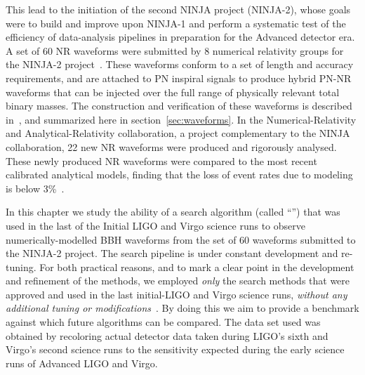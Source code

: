 This lead to the initiation of the second NINJA project (NINJA-2), whose goals 
were to build and improve upon NINJA-1 and perform a systematic test of the 
efficiency of data-analysis pipelines in preparation for the Advanced detector 
era. A set of 60 NR waveforms were submitted by 8 numerical relativity groups 
for the NINJA-2 project~\cite{Ajith:2012az}. These waveforms conform 
to a set of length and accuracy requirements, and
are attached to PN inspiral signals to produce hybrid PN-NR waveforms that can 
be injected over the full range of physically relevant total binary masses.
The construction and verification of these waveforms is described 
in~\cite{Ajith:2012az}, and summarized here in 
section~\ref{sec:waveforms}. In the Numerical-Relativity and 
Analytical-Relativity collaboration, a project complementary to the NINJA 
collaboration, 22 new NR waveforms were produced and rigorously analysed. These 
newly produced NR waveforms were compared to the most recent calibrated 
analytical models, finding that the loss of event rates due to modeling is 
below 3\%~\cite{Hinder:2013oqa}. 

In this chapter we study the ability of a search algorithm (called 
``\ihope{}'') that was 
used in the last of the Initial LIGO and Virgo science runs to observe
numerically-modelled BBH waveforms from the set of 60 waveforms
submitted to the NINJA-2 project. 
% 
The \ihope{} search pipeline is under constant development and re-tuning.
For both practical reasons, and to mark a clear point in the
development and refinement of the methods, we employed \emph{only} the
search methods that were approved and used in the
last initial-LIGO and Virgo science runs, \emph{without any additional tuning
or 
modifications}~\cite{Babak:2012zx,Aasi:2012rja,Abadie:2012rq}. 
By doing this we aim to provide a benchmark against which
future algorithms can be compared.
The data set used was obtained by recoloring actual detector data 
taken during LIGO's sixth and Virgo's second science runs to 
the sensitivity expected during the early science runs of Advanced LIGO
and Virgo.


